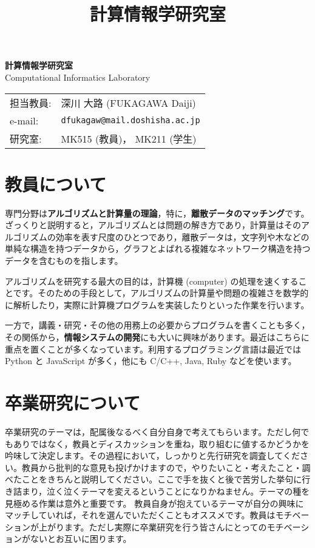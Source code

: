 \documentclass[paper=a4paper,fontsize=10.4pt]{jlreq}
\title{計算情報学研究室}
\date{}
\renewcommand{\emph}[1]{\textbf{#1}}
\begin{document}
\begin{minipage}[t]{.45\textwidth}
\noindent
{\LARGE\bfseries{} 計算情報学研究室}\\
\hspace{.4cm} Computational Informatics Laboratory
\end{minipage}
\begin{minipage}[t]{.45\textwidth}
\begin{tabular}{l@{ }l}
担当教員: & 深川 大路 (FUKAGAWA Daiji) \\
e-mail: & \texttt{dfukagaw@mail.doshisha.ac.jp} \\
研究室: & MK515 (教員)， MK211 (学生)
\end{tabular}
\end{minipage}


\section{教員について}

専門分野は\emph{アルゴリズムと計算量の理論}，特に，\emph{離散データのマッチング}です。
ざっくりと説明すると，アルゴリズムとは問題の解き方であり，計算量はそのアルゴリズムの効率を表す尺度のひとつであり，離散データは，文字列や木などの単純な構造を持つデータから，グラフとよばれる複雑なネットワーク構造を持つデータを含むものを指します。

アルゴリズムを研究する最大の目的は，計算機 (computer) の処理を速くすることです。そのための手段として，アルゴリズムの計算量や問題の複雑さを数学的に解析したり，実際に計算機プログラムを実装したりといった作業を行います。

一方で，講義・研究・その他の用務上の必要からプログラムを書くことも多く，その関係から，\emph{情報システムの開発}にも大いに興味があります。最近はこちらに重点を置くことが多くなっています。利用するプログラミング言語は最近では Python と JavaScript が多く，他にも C/C++, Java, Ruby などを使います。

\section{卒業研究について}

卒業研究のテーマは，配属後なるべく自分自身で考えてもらいます。ただし何でもありではなく，教員とディスカッションを重ね，取り組むに値するかどうかを吟味して決定します。その過程において，しっかりと先行研究を調査してください。教員から批判的な意見も投げかけますので，やりたいこと・考えたこと・調べたことをきちんと説明してください。ここで手を抜くと後で苦労した挙句に行き詰まり，泣く泣くテーマを変えるということになりかねません。テーマの種を見極める作業は意外と重要です。
教員自身が抱えているテーマが自分の興味にマッチしていれば，それを選んでいただくこともオススメです。教員はモチベーションが上がります。ただし実際に卒業研究を行う皆さんにとってのモチベーションがないとお互いに困ります。
\end{document}
